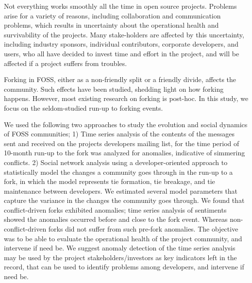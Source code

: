 \documentclass[12pt,letterpaper]{gthesis2}  %
\begin{document}
Not everything works smoothly all the time in open source projects. Problems arise for a variety of reasons, including collaboration and communication problems, which results in uncertainty about the operational health and survivability of the projects. Many stake-holders are affected by this uncertainty, including industry sponsors, individual contributors, corporate developers, and users, who all have decided to invest time and effort in the project, and will be affected if a project suffers from troubles.

Forking in FOSS, either as a non-friendly split or a friendly divide, affects the community. Such effects have been studied, shedding light on how forking happens. However, most existing research on forking is post-hoc. In this study, we focus on the seldom-studied run-up to forking events.

We used the following two approaches to study the evolution and social dynamics of FOSS communities; 1) Time series analysis of the contents of the messages sent and received on the projects developers mailing list, for the time period of 10-month run-up to the fork was analyzed for anomalies, indicative of simmering conflicts. 2) Social network analysis using a developer-oriented approach to statistically model the changes a community goes through in the run-up to a fork, in which the model represents tie formation, tie breakage, and tie maintenance between developers. We estimated several model parameters that capture the variance in the changes the community goes through. We found that conflict-driven forks exhibited anomalies; time series analysis of sentiments showed the anomalies occurred before and close to the fork event. Whereas non-conflict-driven forks did not suffer from such pre-fork anomalies. The objective was to be able to evaluate the operational health of the project community, and intervene if need be. We suggest anomaly detection of the time series analysis may be used by the project stakeholders/investors as key indicators left in the record, that can be used to identify problems among developers, and intervene if need be.
\end{document}
